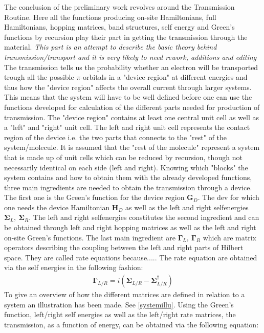 The conclusion of the preliminary work revolves around the Transmission Routine. Here all the functions producing on-site Hamiltonians, full Hamiltonians, hopping matrices, band structures, self energy and Green's functions by recursion play their part in getting the transmission through the material. \textit{This part is an attempt to describe the basic theory behind transmission/transport and it is very likely to need rework, additions and editing} The transmission tells us the probability whether an electron will be transported trough all the possible \(\pi\)-orbitals in a "device region" at different energies and thus how the "device region" affects the overall current through larger systems. This means that the system will have to be well defined before one can use the functions developed for calculation of the different parts needed for production of transmission. The "device region" contains at least one central unit cell as well as a "left" and "right" unit cell. The left and right unit cell represents the contact region of the device i.e. the two parts that connects to the "rest" of the system/molecule. It is assumed that the "rest of the molecule" represent a system that is made up of unit cells which can be reduced by recursion, though not necessarily identical on each side (left and right). Knowing which "blocks" the system contains and how to obtain them with the already developed functions, three main ingredients are needed to obtain the transmission through a device. The first one is the Green's function for the device region \(\mathbf{G}_D\). The dev for which one needs the device Hamiltonian \(\mathbf{H}_D\) as well as the left and right selfenergies \(\mathbf{\Sigma}_L, \ \mathbf{\Sigma}_R\). The left and right selfenergies constitutes the second ingredient and can be obtained through left and right hopping matrices as well as the left and right on-site Green's functions. The last main ingredient are \(\mathbf{\Gamma}_L,\ \mathbf{\Gamma}_R\) which are matrix operators describing the coupling between the left and right parts of Hilbert space. They are called rate equations because..... The rate equation are obtained via the self energies in the following fashion: 
\begin{align}\label{rateeq}
\mathbf{\Gamma}_{L/R} = i(\mathbf{\Sigma}_{L/R} - \mathbf{\Sigma}^{\dagger}_{L/R})
\end{align}To give an overview of how the different matrices are defined in relation to a system an illustration has been made. See \cref{systemillu}. Using the Green's function, left/right self energies as well as the left/right rate matrices, the transmission, as a function of energy, can be obtained via the following equation:
